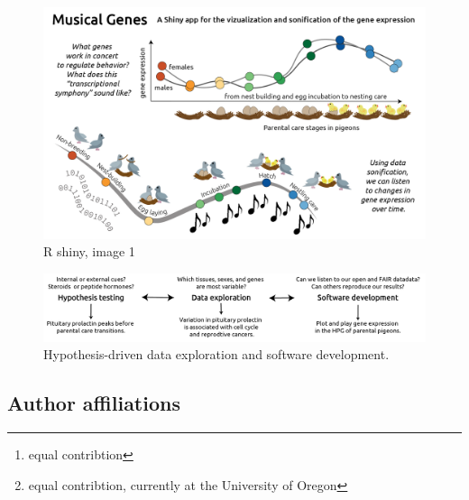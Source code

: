 \newpage

\begin{figure}[ht]
  \centering
  \includegraphics[width=1.0\textwidth]{../../figures/supplfig3}
  \caption{R shiny, image 1}
  \label{figure:supplfig3}
\end{figure}

\begin{figure}[ht]
  \centering
  \includegraphics[width=1.0\textwidth]{../../figures/images/fig_fig5}
  \caption{Hypothesis-driven data exploration and software development.}
  \label{figure:supplfig3}
\end{figure}

\newpage

\hypertarget{author-affiliations}{%
\subsection{Author affiliations}\label{author-affiliations}}


\address{%
Rayna M Harris \footnote{equal contribtion}\\
University of California, Davis\\
\\
}


\address{%
Suzanne H. Austin \footnote{equal contribtion, currently at the
  University of Oregon}\\
University of California, Davis\\
\\
}


